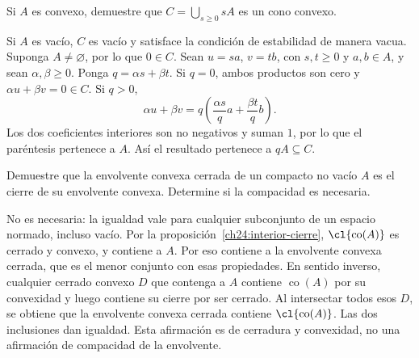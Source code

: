 \begin{ejercicio}
Si $A$ es convexo, demuestre que $C=\bigcup_{s\geq0}sA$ es un cono convexo.
\end{ejercicio}
\begin{solucion}
Si $A$ es vacío, $C$ es vacío y satisface la condición de estabilidad de manera vacua. Suponga $A\ne\varnothing$, por lo que $0\in C$. Sean $u=sa$, $v=tb$, con $s,t\geq0$ y $a,b\in A$, y sean $\alpha,\beta\geq0$. Ponga $q=\alpha s+\beta t$. Si $q=0$, ambos productos son cero y $\alpha u+\beta v=0\in C$. Si $q>0$,
\[
 \alpha u+\beta v
 =q\left(\frac{\alpha s}{q}a+\frac{\beta t}{q}b\right).
\]
Los dos coeficientes interiores son no negativos y suman $1$, por lo que el paréntesis pertenece a $A$. Así el resultado pertenece a $qA\subseteq C$.
\end{solucion}

\begin{ejercicio}
Demuestre que la envolvente convexa cerrada de un compacto no vacío $A$ es el cierre de su envolvente convexa. Determine si la compacidad es necesaria.
\end{ejercicio}
\begin{solucion}
No es necesaria: la igualdad vale para cualquier subconjunto de un espacio normado, incluso vacío. Por la proposición~\ref{ch24:interior-cierre}, $\cl{\operatorname{co}(A)}$ es cerrado y convexo, y contiene a $A$. Por eso contiene a la envolvente convexa cerrada, que es el menor conjunto con esas propiedades. En sentido inverso, cualquier cerrado convexo $D$ que contenga a $A$ contiene $\operatorname{co}(A)$ por su convexidad y luego contiene su cierre por ser cerrado. Al intersectar todos esos $D$, se obtiene que la envolvente convexa cerrada contiene $\cl{\operatorname{co}(A)}$. Las dos inclusiones dan igualdad. Esta afirmación es de cerradura y convexidad, no una afirmación de compacidad de la envolvente.
\end{solucion}

